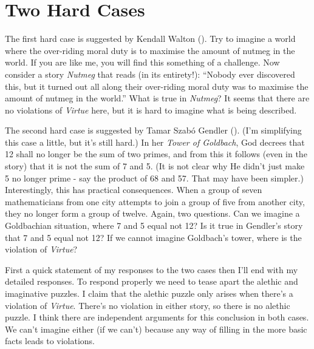 \documentclass[
  11pt,
  letterpaper,
  DIV=11,
  numbers=noendperiod,
  twoside]{scrartcl}
\begin{document}
\section{Two Hard Cases}\label{two-hard-cases}

The first hard case is suggested by Kendall Walton
(). Try to imagine a world where the
over-riding moral duty is to maximise the amount of nutmeg in the world.
If you are like me, you will find this something of a challenge. Now
consider a story \emph{Nutmeg} that reads (in its entirety!): ``Nobody
ever discovered this, but it turned out all along their over-riding
moral duty was to maximise the amount of nutmeg in the world.'' What is
true in \emph{Nutmeg}? It seems that there are no violations of
\emph{Virtue} here, but it is hard to imagine what is being described.

The second hard case is suggested by Tamar Szabó Gendler
(). (I'm simplifying this case a little,
but it's still hard.) In her \emph{Tower of Goldbach}, God decrees that
12 shall no longer be the sum of two primes, and from this it follows
(even in the story) that it is not the sum of 7 and 5. (It is not clear
why He didn't just make 5 no longer prime - say the product of 68 and
57. That may have been simpler.) Interestingly, this has practical
consequences. When a group of seven mathematicians from one city
attempts to join a group of five from another city, they no longer form
a group of twelve. Again, two questions. Can we imagine a Goldbachian
situation, where 7 and 5 equal not 12? Is it true in Gendler's story
that 7 and 5 equal not 12? If we cannot imagine Goldbach's tower, where
is the violation of \emph{Virtue}?

First a quick statement of my responses to the two cases then I'll end
with my detailed responses. To respond properly we need to tease apart
the alethic and imaginative puzzles. I claim that the alethic puzzle
only arises when there's a violation of \emph{Virtue}. There's no
violation in either story, so there is no alethic puzzle. I think there
are independent arguments for this conclusion in both cases. We can't
imagine either (if we can't) because any way of filling in the more
basic facts leads to violations.
\end{document}
